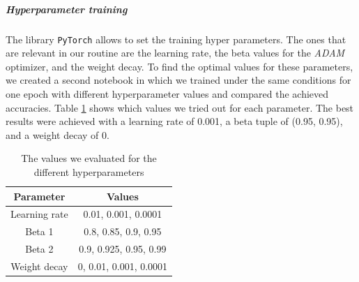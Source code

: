 \documentclass[12pt]{article}
\begin{document}
	\subparagraph{Hyperparameter training}
	The library \texttt{PyTorch} allows to set the training hyper parameters. The ones that are relevant in our routine are the learning rate, the beta values for the \textit{ADAM} optimizer, and the weight decay. To find the optimal values for these parameters, we created a second notebook in which we trained under the same conditions for one epoch with different hyperparameter values and compared the achieved accuracies. Table \ref{tab:hyperparams} shows which values we tried out for each parameter. The best results were achieved with a learning rate of 0.001, a beta tuple of (0.95, 0.95), and a weight decay of 0.
	\begin{table}[h!]
		\begin{tabular}{c|c}
			\textbf{Parameter} & \textbf{Values} \\
			\hline
			Learning rate & 0.01, 0.001, 0.0001 \\
			Beta 1 & 0.8, 0.85, 0.9, 0.95 \\
			Beta 2 & 0.9, 0.925, 0.95, 0.99 \\
			Weight decay & 0, 0.01, 0.001, 0.0001
		\end{tabular}
		\caption{The values we evaluated for the different hyperparameters}
		\label{tab:hyperparams}
	\end{table}
	
\end{document}
